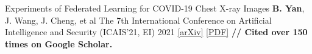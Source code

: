 \begin{cvpublications}

\cvpublication
{Experiments of Federated Learning for COVID-19 Chest X-ray Images} %
{\textbf{B. Yan}, J. Wang, J. Cheng, et al} %
{The 7th International Conference on Artificial Intelligence and Security (ICAIS'21, EI)} %
{2021} %
{
	\href{https://arxiv.org/abs/2007.05592}{[arXiv]} \href{https://link.springer.com/chapter/10.1007/978-3-030-78618-2_4}{[PDF]}
	\textbf{ // Cited over 150 times on Google Scholar.} 
} %







\end{cvpublications}






